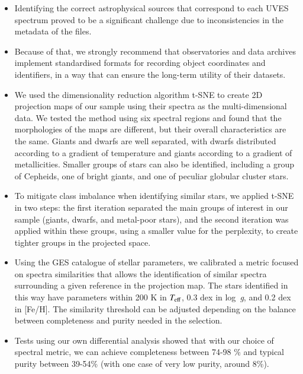 \documentclass{aa}
\def\teff{$\textit{T}_{\rm{eff}}$}
\def\logg{\mbox{log~{\it g}}}
\begin{document}
\begin{itemize}

    \item Identifying the correct astrophysical sources that correspond to each UVES spectrum proved to be a significant challenge due to inconsistencies in the metadata of the files.
 
    \item Because of that, we strongly recommend that observatories and data archives implement standardised formats for recording object coordinates and identifiers, in a way that can ensure the long-term utility of their datasets.

    \item We used the dimensionality reduction algorithm t-SNE to create 2D projection maps of our sample using their spectra as the multi-dimensional data. We tested the method using six spectral regions and found that the morphologies of the maps are different, but their overall characteristics are the same. Giants and dwarfs are well separated, with dwarfs distributed according to a gradient of temperature and giants according to a gradient of metallicities. Smaller groups of stars can also be identified, including a group of Cepheids, one of bright giants, and one of peculiar globular cluster stars.
    
\item To mitigate class imbalance when identifying similar stars, we applied t-SNE in two steps: the first iteration separated the main groups of interest in our sample (giants, dwarfs, and metal-poor stars), and the second iteration was applied within these groups, using a smaller value for the perplexity, to create tighter groups in the projected space.

    \item Using the GES catalogue of stellar parameters, we calibrated a metric focused on spectra similarities that allows the identification of similar spectra surrounding a given reference in the projection map. The stars identified in this way have parameters within 200 K in \teff, 0.3 dex in \logg, and 0.2 dex in [Fe/H]. The similarity threshold can be adjusted depending on the balance between completeness and purity needed in the selection.

\item Tests using our own differential analysis showed that with our choice of spectral metric, we can achieve completeness between 74-98 \% and typical purity between 39-54\% (with one case of very low purity, around 8\%).


\end{itemize}
\end{document}
